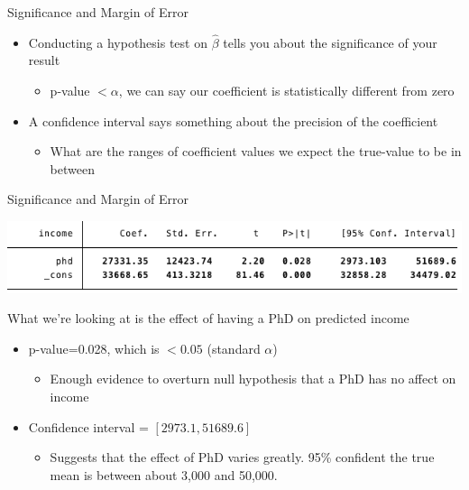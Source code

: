 \documentclass{beamer}
\begin{document}
\begin{frame}{Significance and Margin of Error}
	\begin{itemize}
		\item Conducting a hypothesis test on $\hat{\beta}$ tells you about the \alert{significance} of your result
			\begin{itemize}
		      	\item p-value $< \alpha$, we can say our coefficient is statistically different from zero
			\end{itemize}

		\item A confidence interval says something about the precision of the coefficient
			\begin{itemize}
		      	\item What are the ranges of coefficient values we expect the true-value to be in between
			\end{itemize}
	\end{itemize}
\end{frame}


\begin{frame}{Significance and Margin of Error}
	
	\begin{center}
		\includegraphics[width=\textwidth]{incphd}
	\end{center}

	\small{
		What we're looking at is the effect of having a PhD on predicted income

		\begin{itemize}
			\item p-value=0.028, which is $<0.05$ (standard $\alpha$)
				\begin{itemize}
			      	\item Enough evidence to overturn null hypothesis that a PhD has no affect on income
				\end{itemize}
			\item Confidence interval = $[2973.1, 51689.6]$
				\begin{itemize}
			      	\item Suggests that the effect of PhD varies greatly. 95\% confident the true mean is between about 3,000 and 50,000. 
				\end{itemize}
		\end{itemize}
	}
\end{frame}
\end{document}
